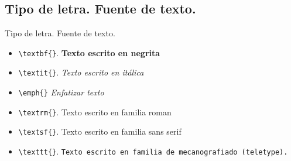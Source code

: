 \documentclass[aspectratio=169, 10pt]{beamer}
\begin{document}
\subsection{Tipo de letra. Fuente de texto.}
\begin{frame}[fragile]{Tipo de letra. Fuente de texto.}

    \begin{itemize}
        \item \verb|\textbf{}|. \textbf{Texto escrito en negrita}
        \item \verb|\textit{}|. \textit{Texto escrito en itálica}
        \item \verb|\emph{}| \emph{Enfatizar texto}
        \item \verb|\textrm{}|. \textrm{Texto escrito en familia roman}
        \item \verb|\textsf{}|. \textsf{Texto escrito en familia sans serif}
        \item \verb|\texttt{}|. \texttt{Texto escrito en familia de mecanografiado (teletype).}
    \end{itemize}
    
    
\end{frame}
\end{document}
